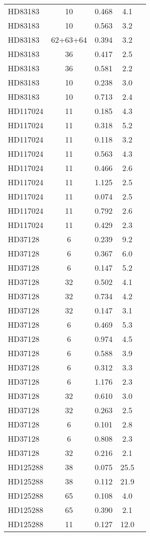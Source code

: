 \begin{table*}
\begin{tabular}{l c c c c}
HD83183 & 10 & 0.468 & 4.1\\ 
HD83183 & 10 & 0.563 & 3.2\\ 
HD83183 & 62+63+64 & 0.394 & 3.2\\ 
HD83183 & 36 & 0.417 & 2.5\\ 
HD83183 & 36 & 0.581 & 2.2\\ 
HD83183 & 10 & 0.238 & 3.0\\ 
HD83183 & 10 & 0.713 & 2.4\\ 
\hline
HD117024 & 11 & 0.185 & 4.3\\ 
HD117024 & 11 & 0.318 & 5.2\\ 
HD117024 & 11 & 0.118 & 3.2\\ 
HD117024 & 11 & 0.563 & 4.3\\ 
HD117024 & 11 & 0.466 & 2.6\\ 
HD117024 & 11 & 1.125 & 2.5\\ 
HD117024 & 11 & 0.074 & 2.5\\ 
HD117024 & 11 & 0.792 & 2.6\\ 
HD117024 & 11 & 0.429 & 2.3\\ 
\hline
HD37128 & 6 & 0.239 & 9.2\\ 
HD37128 & 6 & 0.367 & 6.0\\ 
HD37128 & 6 & 0.147 & 5.2\\ 
HD37128 & 32 & 0.502 & 4.1\\ 
HD37128 & 32 & 0.734 & 4.2\\ 
HD37128 & 32 & 0.147 & 3.1\\ 
HD37128 & 6 & 0.469 & 5.3\\ 
HD37128 & 6 & 0.974 & 4.5\\ 
HD37128 & 6 & 0.588 & 3.9\\ 
HD37128 & 6 & 0.312 & 3.3\\ 
HD37128 & 6 & 1.176 & 2.3\\ 
HD37128 & 32 & 0.610 & 3.0\\ 
HD37128 & 32 & 0.263 & 2.5\\ 
HD37128 & 6 & 0.101 & 2.8\\ 
HD37128 & 6 & 0.808 & 2.3\\ 
HD37128 & 32 & 0.216 & 2.1\\ 
\hline
HD125288 & 38 & 0.075 & 25.5\\ 
HD125288 & 38 & 0.112 & 21.9\\ 
HD125288 & 65 & 0.108 & 4.0\\ 
HD125288 & 65 & 0.390 & 2.1\\ 
HD125288 & 11 & 0.127 & 12.0\\ 

\end{tabular}
\end{table*}
